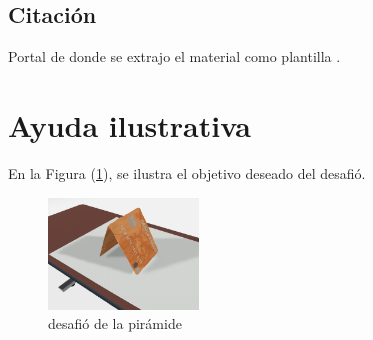 \documentclass{article}
\begin{document}
\subsection{Citación}
Portal de donde se extrajo el material como plantilla \cite{classroom}.



\section{Ayuda ilustrativa} \label{imagenes}

En la Figura (\ref{fig:objetivofinal}), se ilustra el objetivo deseado del desafió.

\begin{figure}[h]
\includegraphics[width=4cm]{objetivofinal.png}
\centering
\caption{desafió de la pirámide}
\label{fig:objetivofinal}
\end{figure}




\end{document}
